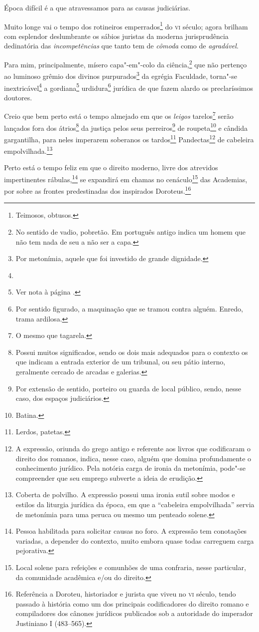 \noindent{}Época difícil é a que atravessamos para as causas judiciárias.

Muito longe vai o tempo dos rotineiros emperrados\footnote{Teimosos,
  obtusos.} do \textsc{vi} século; agora brilham com esplendor deslumbrante os
sábios juristas da moderna jurisprudência dedinatória das
\emph{incompetências} que tanto tem de \emph{cômoda} como de
\emph{agradável}.

Para mim, principalmente, mísero capa"-em"-colo da ciência,\footnote{No
  sentido de vadio, pobretão. Em português antigo indica um homem que
  não tem nada de seu a não ser a capa.} que não pertenço ao luminoso
grêmio dos divinos purpurados\footnote{Por metonímia, aquele que foi
  investido de grande dignidade.} da egrégia Faculdade, torna"-se
inextricável\footnote{} a gordiana\footnote{Ver nota à página \pageref{gordio}.}
urdidura\footnote{Por sentido figurado, a maquinação que se tramou
  contra alguém. Enredo, trama ardilosa.} jurídica de que fazem alardo
os preclaríssimos doutores.

Creio que bem perto está o tempo almejado em que os \emph{leigos}
tarelos\footnote{O mesmo que tagarela.} serão
lançados fora dos átrios\footnote{Possui muitos significados, sendo os
  dois mais adequados para o contexto os que indicam a entrada exterior
  de um tribunal, ou seu pátio interno, geralmente cercado de arcadas e
  galerias.} da justiça pelos seus perreiros\footnote{Por extensão de
  sentido, porteiro ou guarda de local público, sendo, nesse caso, dos
  espaços judiciários.} de roupeta\footnote{Batina.} e cândida
gargantilha, para neles imperarem soberanos os tardos\footnote{Lerdos,
  patetas.} Pandectas\footnote{A expressão, oriunda do grego antigo e
  referente aos livros que codificaram o direito dos romanos, indica,
  nesse caso, alguém que domina profundamente o conhecimento jurídico.
  Pela notória carga de ironia da metonímia, pode"-se compreender que seu
  emprego subverte a ideia de erudição.} de cabeleira
empolvilhada.\footnote{Coberta de polvilho. A expressão possui uma
  ironia sutil sobre modos e estilos da liturgia jurídica da época, em
que a ``cabeleira empolvilhada'' servia de metonímia para uma peruca ou
  mesmo um penteado solene.}

Perto está o tempo feliz em que o direito moderno, livre dos atrevidos
impertinentes rábulas,\footnote{Pessoa habilitada para solicitar causas
  no foro. A expressão tem conotações variadas, a depender do contexto,
  muito embora quase todas carreguem carga pejorativa.} se expandirá em
chamas no cenáculo\footnote{Local solene para refeições e comunhões de
  uma confraria, nesse particular, da comunidade acadêmica e/ou do
  direito.} das Academias, por sobre as frontes predestinadas dos
inspirados Doroteus.\footnote{Referência a Doroteu, historiador e
  jurista que viveu no \textsc{vi} século, tendo passado à história como um dos
  principais codificadores do direito romano e compiladores dos cânones
  jurídicos publicados sob a autoridade do imperador Justiniano I
  (483--565).}

